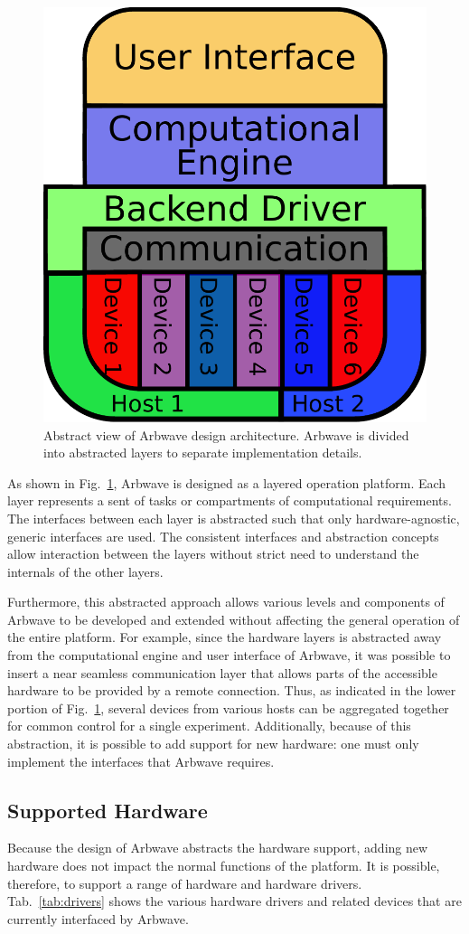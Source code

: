 \begin{figure}[ht!]
  \centerline{\includegraphics[width=.4\textwidth]{figures/design-layout}}
  \caption[Arbwave design architecture]{
    Abstract view of Arbwave design architecture.  Arbwave is divided into
    abstracted layers to separate implementation details.
  }
  \label{fig:intro:design}
\end{figure}

As shown in Fig.~\ref{fig:intro:design}, Arbwave is designed as a layered
operation platform.  Each layer represents a sent of tasks or compartments of
computational requirements.  The interfaces between each layer is abstracted
such that only hardware-agnostic, generic interfaces are used.  The consistent
interfaces and abstraction concepts allow interaction between the layers without
strict need to understand the internals of the other layers.

Furthermore, this abstracted approach allows various levels and components of
Arbwave to be developed and extended without affecting the general operation of
the entire platform.  For example, since the hardware layers is abstracted away
from the computational engine and user interface of Arbwave, it was possible to
insert a near seamless communication layer that allows parts of the accessible
hardware to be provided by a remote connection.  Thus, as indicated in the lower
portion of Fig.~\ref{fig:intro:design}, several devices from various hosts can
be aggregated together for common control for a single experiment.
Additionally, because of this abstraction, it is possible to add support for new
hardware: one must only implement the interfaces that Arbwave requires.


\subsection{Supported Hardware}\label{sec:hardware}

Because the design of Arbwave abstracts the hardware support, adding new hardware does
not impact the normal functions of the platform.  It is possible, therefore, to
support a range of hardware and hardware drivers.  Tab.~\ref{tab:drivers} shows
the various hardware drivers and related devices that are currently interfaced
by Arbwave.

